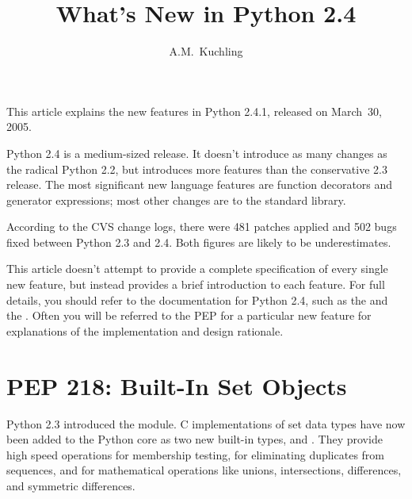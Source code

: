 \documentclass{howto}
\title{What's New in Python 2.4}
\author{A.M.\ Kuchling}
\begin{document}
\maketitle
\tableofcontents

This article explains the new features in Python 2.4.1, released on
March~30, 2005.

Python 2.4 is a medium-sized release.  It doesn't introduce as many
changes as the radical Python 2.2, but introduces more features than
the conservative 2.3 release.  The most significant new language
features are function decorators and generator expressions; most other
changes are to the standard library.

According to the CVS change logs, there were 481 patches applied and
502 bugs fixed between Python 2.3 and 2.4.  Both figures are likely to
be underestimates.

This article doesn't attempt to provide a complete specification of
every single new feature, but instead provides a brief introduction to
each feature.  For full details, you should refer to the documentation
for Python 2.4, such as the  and the .  Often you will be referred to the PEP for a particular new
feature for explanations of the implementation and design rationale.


\section{PEP 218: Built-In Set Objects}

Python 2.3 introduced the  module.  C implementations of
set data types have now been added to the Python core as two new
built-in types,  and
.  They provide high speed
operations for membership testing, for eliminating duplicates from
sequences, and for mathematical operations like unions, intersections,
differences, and symmetric differences.
\end{document}
